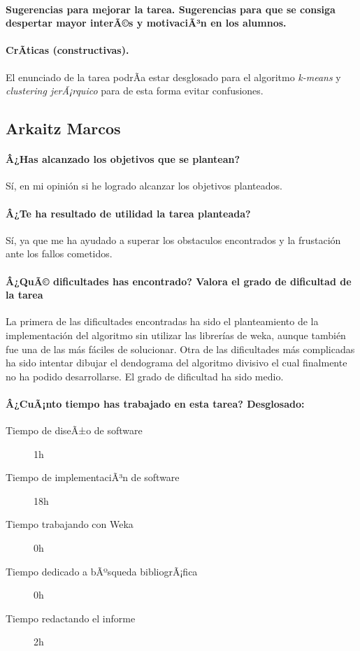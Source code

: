 \documentclass[11pt, titlepage,a4paper]{article}
\begin{document}
\paragraph{Sugerencias para mejorar la tarea. Sugerencias para que se consiga despertar mayor
interÃ©s y motivaciÃ³n en los alumnos.\\}

\paragraph{CrÃ­ticas (constructivas).\\}
El enunciado de la tarea podrÃ­a estar desglosado para el algoritmo
\textit{k-means} y \textit{clustering jerÃ¡rquico} para de esta forma evitar confusiones.

\subsection{Arkaitz Marcos}
\paragraph{Â¿Has alcanzado los objetivos que se plantean?\\}
Sí, en mi opinión si he logrado alcanzar los objetivos planteados.

\paragraph{Â¿Te ha resultado de utilidad la tarea planteada?\\}
Sí, ya que me ha ayudado a superar los obstaculos encontrados y la frustación
ante los fallos cometidos.

\paragraph{Â¿QuÃ© dificultades has encontrado? Valora el grado de dificultad de
la tarea\\}
La primera de las dificultades encontradas ha sido el planteamiento de la
implementación del algoritmo sin utilizar las librerías de weka, aunque también
fue una de las más fáciles de solucionar.
Otra de las dificultades más complicadas ha sido intentar dibujar el dendograma
del algoritmo divisivo el cual finalmente no ha podido desarrollarse.
El grado de dificultad ha sido medio.

\paragraph{Â¿CuÃ¡nto tiempo has trabajado en esta tarea? Desglosado:\\}
\begin{description}
	\item[Tiempo de diseÃ±o de software] 1h
	\item[Tiempo de implementaciÃ³n de software] 18h
	\item[Tiempo trabajando con Weka] 0h
	\item[Tiempo dedicado a bÃºsqueda bibliogrÃ¡fica] 0h
	\item[Tiempo redactando el informe] 2h
\end{description}
\end{document}
